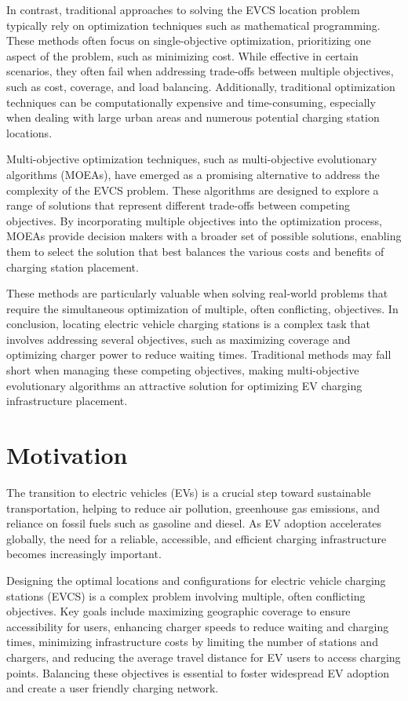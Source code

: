 In contrast, traditional approaches to solving the EVCS location problem typically rely on optimization techniques such as mathematical programming. These methods often focus on single-objective optimization, prioritizing one aspect of the problem, such as minimizing cost. While effective in certain scenarios, they often fail when addressing trade-offs between multiple objectives, such as cost, coverage, and load balancing. Additionally, traditional optimization techniques can be computationally expensive and time-consuming, especially when dealing with large urban areas and numerous potential charging station locations.

Multi-objective optimization techniques, such as multi-objective evolutionary algorithms (MOEAs), have emerged as a promising alternative to address the complexity of the EVCS problem. These algorithms are designed to explore a range of solutions that represent different trade-offs between competing objectives. By incorporating multiple objectives into the optimization process, MOEAs provide decision makers with a broader set of possible solutions, enabling them to select the solution that best balances the various costs and benefits of charging station placement.

These methods are particularly valuable when solving real-world problems that require the simultaneous optimization of multiple, often conflicting, objectives. In conclusion, locating electric vehicle charging stations is a complex task that involves addressing several objectives, such as maximizing coverage and optimizing charger power to reduce waiting times. Traditional methods may fall short when managing these competing objectives, making multi-objective evolutionary algorithms an attractive solution for optimizing EV charging infrastructure placement.

\section{Motivation}

The transition to electric vehicles (EVs) is a crucial step toward sustainable transportation, helping to reduce air pollution, greenhouse gas emissions, and reliance on fossil fuels such as gasoline and diesel. As EV adoption accelerates globally, the need for a reliable, accessible, and efficient charging infrastructure becomes increasingly important. 

Designing the optimal locations and configurations for electric vehicle charging stations (EVCS) is a complex problem involving multiple, often conflicting objectives. Key goals include maximizing geographic coverage to ensure accessibility for users, enhancing charger speeds to reduce waiting and charging times, minimizing infrastructure costs by limiting the number of stations and chargers, and reducing the average travel distance for EV users to access charging points. Balancing these objectives is essential to foster widespread EV adoption and create a user friendly charging network.


